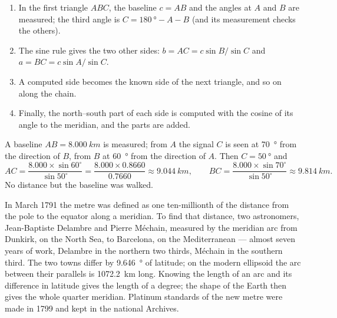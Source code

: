 \begin{method}\label{met:g10:measuring-the-earth:chain}
\begin{enumerate}
  \item In the first triangle $ABC$, the baseline $c = AB$ and the angles at
        $A$ and $B$ are measured; the third angle is
        $C = \qty{180}{\degree} - A - B$ (and its measurement checks the
        others).
  \item The sine rule gives the two other sides:
        $b = AC = c \sin B / \sin C$ and $a = BC = c \sin A / \sin C$.
  \item A computed side becomes the known side of the next triangle, and so
        on along the chain.
  \item Finally, the north--south part of each side is computed with the
        cosine of its angle to the meridian, and the parts are added.
\end{enumerate}
\end{method}

\begin{example}\label{ex:g10:measuring-the-earth:triangle}
A baseline $AB = \qty{8.000}{km}$ is measured; from $A$ the signal $C$ is
seen at \qty{70}{\degree} from the direction of $B$, from $B$ at
\qty{60}{\degree} from the direction of $A$. Then $C = \qty{50}{\degree}$ and
\[
  AC = \frac{8.000 \times \sin 60^\circ}{\sin 50^\circ} = \frac{8.000 \times 0.8660}{0.7660}
  \approx \qty{9.044}{km}, \qquad
  BC = \frac{8.000 \times \sin 70^\circ}{\sin 50^\circ} \approx \qty{9.814}{km}.
\]
No distance but the baseline was walked.
\end{example}

\begin{example}\label{ex:g10:measuring-the-earth:meridian}
In March 1791 the metre was defined as one ten-millionth of the distance
from the pole to the equator along a meridian. To find that distance, two
astronomers, Jean-Baptiste Delambre and Pierre Méchain, measured by
 the meridian arc from Dunkirk, on the North Sea, to
Barcelona, on the Mediterranean --- almost seven years of work, Delambre in
the northern two thirds, Méchain in the southern third. The two towns differ
by \qty{9.646}{\degree} of latitude; on the modern ellipsoid the arc between
their parallels is \qty{1072.2}{km} long. Knowing the length of an arc and its
difference in latitude gives the length of a degree; the shape of the Earth
then gives the whole quarter meridian. Platinum standards of the new metre
were made in 1799 and kept in the national Archives.
\end{example}

